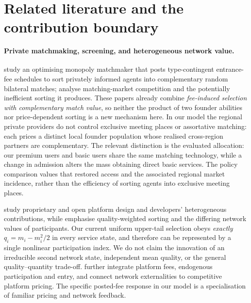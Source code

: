 \section{Related literature and the contribution boundary}\label{sec:literature}

\paragraph{Private matchmaking, screening, and heterogeneous network value.}
\citet{DamianoLi2007} study an optimising monopoly matchmaker that posts type-contingent entrance-fee schedules to sort privately informed agents into complementary random bilateral matches; \citet{DamianoLi2008} analyse matching-market competition and the potentially inefficient sorting it produces. These papers already combine \emph{fee-induced selection with complementary match value}, so neither the product of two founder abilities nor price-dependent sorting is a new mechanism here. In our model the regional private providers do not control exclusive meeting places or assortative matching: each prices a distinct local founder population whose realised cross-region partners are complementary. The relevant distinction is the evaluated allocation: our premium users and basic users share the same matching technology, while a change in admission alters the mass obtaining direct basic services. The policy comparison values that restored access and the associated regional market incidence, rather than the efficiency of sorting agents into exclusive meeting places.

\citet{Hagiu2004,Hagiu2004b} study proprietary and open platform design and developers' heterogeneous contributions, while \citet{VeigaWeylWhite2017} emphasise quality-weighted sorting and the differing network values of participants. Our current uniform upper-tail selection obeys \emph{exactly} $q_i=m_i-m_i^2/2$ in every service state, and therefore can be represented by a single nonlinear participation index. We do not claim the innovation of an irreducible second network state, independent mean quality, or the general quality--quantity trade-off. \citet{PeitzSato2026} further integrate platform fees, endogenous participation and entry, and \citet{LuMatsushimaShekhar2025} connect network externalities to competitive platform pricing. The specific posted-fee response in our model is a specialisation of familiar pricing and network feedback.

